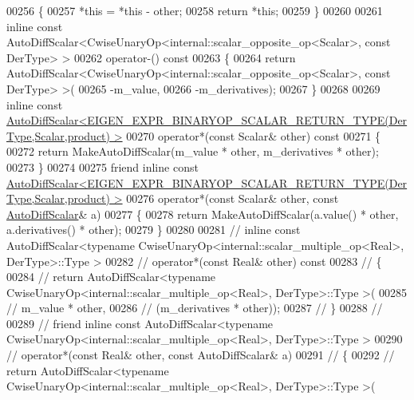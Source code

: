 \begin{DoxyCode}
00256     \{
00257       *\textcolor{keyword}{this} = *\textcolor{keyword}{this} - other;
00258       \textcolor{keywordflow}{return} *\textcolor{keyword}{this};
00259     \}
00260 
00261     \textcolor{keyword}{inline} \textcolor{keyword}{const} AutoDiffScalar<CwiseUnaryOp<internal::scalar\_opposite\_op<Scalar>, \textcolor{keyword}{const} DerType> >
00262     operator-()\textcolor{keyword}{ const}
00263 \textcolor{keyword}{    }\{
00264       \textcolor{keywordflow}{return} AutoDiffScalar<CwiseUnaryOp<internal::scalar\_opposite\_op<Scalar>, \textcolor{keyword}{const} DerType> >(
00265         -m\_value,
00266         -m\_derivatives);
00267     \}
00268 
00269     \textcolor{keyword}{inline} \textcolor{keyword}{const} 
      \hyperlink{class_eigen_1_1_auto_diff_scalar}{AutoDiffScalar<EIGEN\_EXPR\_BINARYOP\_SCALAR\_RETURN\_TYPE(DerType,Scalar,product) >}
00270     operator*(\textcolor{keyword}{const} Scalar& other)\textcolor{keyword}{ const}
00271 \textcolor{keyword}{    }\{
00272       \textcolor{keywordflow}{return} MakeAutoDiffScalar(m\_value * other, m\_derivatives * other);
00273     \}
00274 
00275     \textcolor{keyword}{friend} \textcolor{keyword}{inline} \textcolor{keyword}{const} 
      \hyperlink{class_eigen_1_1_auto_diff_scalar}{AutoDiffScalar<EIGEN\_EXPR\_BINARYOP\_SCALAR\_RETURN\_TYPE(DerType,Scalar,product) >}
00276     operator*(\textcolor{keyword}{const} Scalar& other, \textcolor{keyword}{const} \hyperlink{class_eigen_1_1_auto_diff_scalar}{AutoDiffScalar}& a)
00277     \{
00278       \textcolor{keywordflow}{return} MakeAutoDiffScalar(a.value() * other, a.derivatives() * other);
00279     \}
00280 
00281 \textcolor{comment}{//     inline const AutoDiffScalar<typename CwiseUnaryOp<internal::scalar\_multiple\_op<Real>, DerType>::Type
       >}
00282 \textcolor{comment}{//     operator*(const Real& other) const}
00283 \textcolor{comment}{//     \{}
00284 \textcolor{comment}{//       return AutoDiffScalar<typename CwiseUnaryOp<internal::scalar\_multiple\_op<Real>, DerType>::Type >(}
00285 \textcolor{comment}{//         m\_value * other,}
00286 \textcolor{comment}{//         (m\_derivatives * other));}
00287 \textcolor{comment}{//     \}}
00288 \textcolor{comment}{//}
00289 \textcolor{comment}{//     friend inline const AutoDiffScalar<typename CwiseUnaryOp<internal::scalar\_multiple\_op<Real>,
       DerType>::Type >}
00290 \textcolor{comment}{//     operator*(const Real& other, const AutoDiffScalar& a)}
00291 \textcolor{comment}{//     \{}
00292 \textcolor{comment}{//       return AutoDiffScalar<typename CwiseUnaryOp<internal::scalar\_multiple\_op<Real>, DerType>::Type >(}

\end{DoxyCode}
